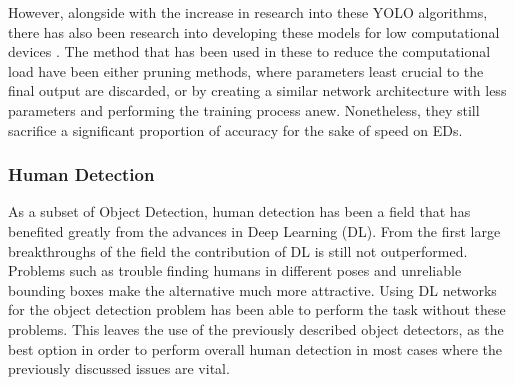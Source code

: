 However, alongside with the increase in research into these 
YOLO algorithms, there has also been research into developing these models for 
low computational devices \cite{YOLO-Lite,Mixed-Yolo_Lite, yolov3-tiny}. 
The method that has been used in these to reduce the computational load have been 
either pruning methods, where parameters least crucial to the final output are discarded,
or by creating a similar network architecture with less parameters and performing the training 
process anew. Nonetheless, they still sacrifice a significant proportion of accuracy for 
the sake of speed on EDs. 



\subsubsection{Human Detection}
As a subset of Object Detection, human detection has been a field that has benefited
greatly from the advances in Deep Learning (DL). From the first large breakthroughs of 
the field \cite{haarcascades, HOGdetection} the contribution of DL is still not 
outperformed. Problems such as trouble finding humans in different poses and unreliable 
bounding boxes make the alternative much more attractive. Using DL networks for the 
object detection problem has been able to perform the task without these problems. This 
leaves the use of the previously described object detectors, as the best option in order 
to perform overall human detection in most cases where the previously discussed issues 
are vital. 

